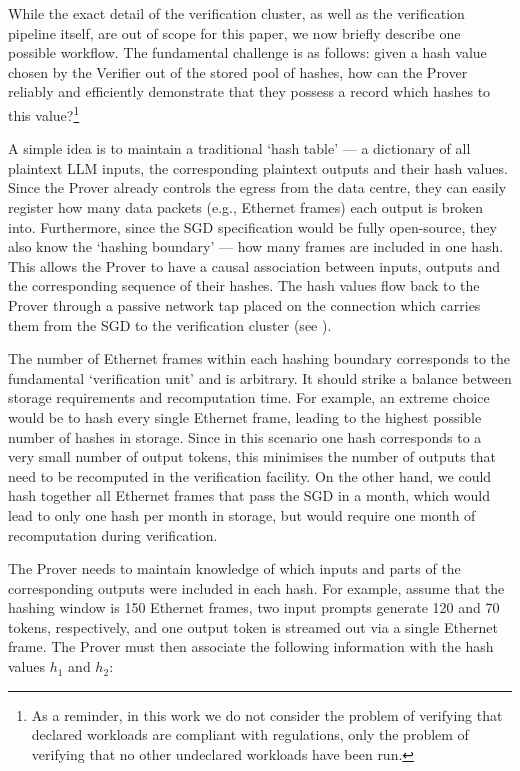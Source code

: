 \documentclass{article}
\begin{document}
While the exact detail of the verification cluster, as well as the verification pipeline itself, are out of scope for this paper, we now briefly describe one possible workflow. The fundamental challenge is as follows: given a hash value chosen by the Verifier out of the stored pool of hashes, how can the Prover reliably and efficiently demonstrate that they possess a record which hashes to this value?\footnote{As a reminder, in this work we do not consider the problem of verifying that declared workloads are compliant with regulations, only the problem of verifying that no other undeclared workloads have been run.}

A simple idea is to maintain a traditional `hash table' --- a dictionary of all plaintext LLM inputs, the corresponding plaintext outputs and their hash values. Since the Prover already controls the egress from the data centre, they can easily register how many data packets (e.g., Ethernet frames) each output is broken into. Furthermore, since the SGD specification would be fully open-source, they also know the `hashing boundary' --- how many frames are included in one hash. This allows the Prover to have a causal association between inputs, outputs and the corresponding sequence of their hashes. The hash values flow back to the Prover through a passive network tap placed on the connection which carries them from the SGD to the verification cluster (see ).

The number of Ethernet frames within each hashing boundary corresponds to the fundamental `verification unit' and is arbitrary. It should strike a balance between storage requirements and recomputation time. For example, an extreme choice would be to hash every single Ethernet frame, leading to the highest possible number of hashes in storage. Since in this scenario one hash corresponds to a very small number of output tokens, this minimises the number of outputs that need to be recomputed in the verification facility. On the other hand, we could hash together all Ethernet frames that pass the SGD in a month, which would lead to only one hash per month in storage, but would require one month of recomputation during verification.

The Prover needs to maintain knowledge of which inputs and parts of the corresponding outputs were included in each hash. For example, assume that the hashing window is 150 Ethernet frames, two input prompts generate 120 and 70 tokens, respectively, and one output token is streamed out via a single Ethernet frame. The Prover must then associate the following information with the hash values $h_1$ and $h_2$:
\end{document}
